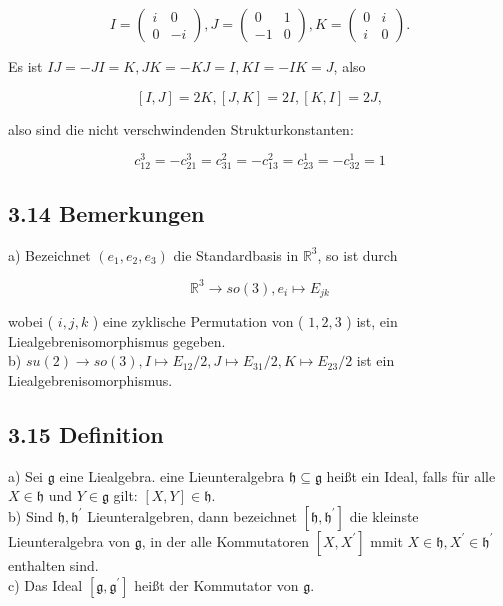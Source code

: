 \documentclass[10pt, letterpaper]{article}
\begin{document}
$$
I=\left(\begin{array}{cc}
i & 0 \\
0 & -i
\end{array}\right), J=\left(\begin{array}{cc}
0 & 1 \\
-1 & 0
\end{array}\right), K=\left(\begin{array}{cc}
0 & i \\
i & 0
\end{array}\right) .
$$

Es ist $I J=-J I=K, J K=-K J=I, K I=-I K=J$, also

$$
[I, J]=2 K,[J, K]=2 I,[K, I]=2 J,
$$

also sind die nicht verschwindenden Strukturkonstanten:

$$
c_{12}^{3}=-c_{21}^{3}=c_{31}^{2}=-c_{13}^{2}=c_{23}^{1}=-c_{32}^{1}=1
$$

\subsection*{3.14 Bemerkungen}
a) Bezeichnet $\left(e_{1}, e_{2}, e_{3}\right)$ die Standardbasis in $\mathbb{R}^{3}$, so ist durch

$$
\mathbb{R}^{3} \rightarrow s o(3), e_{i} \mapsto E_{j k}
$$

wobei ( $i, j, k$ ) eine zyklische Permutation von ( $1,2,3$ ) ist, ein Liealgebrenisomorphismus gegeben.\\
b) $s u(2) \rightarrow s o(3), I \mapsto E_{12} / 2, J \mapsto E_{31} / 2, K \mapsto E_{23} / 2$ ist ein Liealgebrenisomorphismus.

\subsection*{3.15 Definition}
a) Sei $\mathfrak{g}$ eine Liealgebra. eine Lieunteralgebra $\mathfrak{h} \subseteq \mathfrak{g}$ heißt ein Ideal, falls für alle $X \in \mathfrak{h}$ und $Y \in \mathfrak{g}$ gilt: $[X, Y] \in \mathfrak{h}$.\\
b) Sind $\mathfrak{h}, \mathfrak{h}^{\prime}$ Lieunteralgebren, dann bezeichnet $\left[\mathfrak{h}, \mathfrak{h}^{\prime}\right]$ die kleinste Lieunteralgebra von $\mathfrak{g}$, in der alle Kommutatoren $\left[X, X^{\prime}\right]$ mmit $X \in \mathfrak{h}, X^{\prime} \in \mathfrak{h}^{\prime}$ enthalten sind.\\
c) Das Ideal $\left[\mathfrak{g}, \mathfrak{g}^{\prime}\right]$ heißt der Kommutator von $\mathfrak{g}$.
\end{document}
